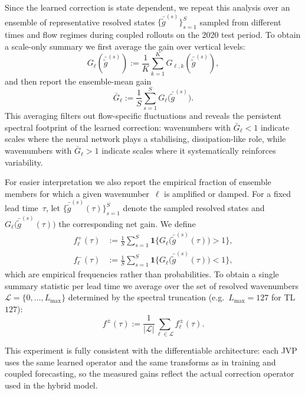 Since the learned correction is state dependent, we repeat this
analysis over an ensemble of representative resolved states
$\{\bar{\tilde{g}}^{(s)}\}_{s=1}^{S}$ sampled from different times
and flow regimes during coupled rollouts on the 2020 test period.
To obtain a scale-only summary we first average the gain over vertical
levels:
\begin{equation}
  G_{\ell}(\bar{\tilde{g}}^{(s)})
  :=
  \frac{1}{K}\sum_{k=1}^{K}
    G_{\ell,k}(\bar{\tilde{g}}^{(s)}),
\end{equation}
and then report the ensemble-mean gain
\begin{equation}
  \bar{G}_{\ell}
  :=
  \frac{1}{S}\sum_{s=1}^{S}
    G_{\ell}\!\bigl(\bar{\tilde{g}}^{(s)}\bigr).
\end{equation}
This averaging filters out flow-specific fluctuations and reveals the
persistent spectral footprint of the learned correction: wavenumbers
with $\bar{G}_{\ell} < 1$ indicate scales where the neural network
plays a stabilising, dissipation-like role, while wavenumbers with
$\bar{G}_{\ell} > 1$ indicate scales where it systematically reinforces
variability.

For easier interpretation we also report the empirical fraction of
ensemble members for which a given wavenumber~$\ell$ is amplified or
damped.  For a fixed lead time~$\tau$, let
$\{\bar{\tilde{g}}^{(s)}(\tau)\}_{s=1}^{S}$ denote the sampled
resolved states and $G_{\ell}\!\bigl(\bar{\tilde{g}}^{(s)}(\tau)\bigr)$
the corresponding net gain.  We define
\begin{align}
  f^{+}_{\ell}(\tau)
  &:=
  \frac{1}{S}\sum_{s=1}^{S}
    \mathbf{1}\!\bigl\{
      G_{\ell}\!\bigl(\bar{\tilde{g}}^{(s)}(\tau)\bigr) > 1
    \bigr\},
  \\
  f^{-}_{\ell}(\tau)
  &:=
  \frac{1}{S}\sum_{s=1}^{S}
    \mathbf{1}\!\bigl\{
      G_{\ell}\!\bigl(\bar{\tilde{g}}^{(s)}(\tau)\bigr) < 1
    \bigr\},
\end{align}
which are empirical frequencies rather than probabilities.  To obtain a
single summary statistic per lead time we average over the set of
resolved wavenumbers
$\mathcal{L} = \{0,\dots,L_{\max}\}$ determined by the spectral
truncation (e.g.\ $L_{\max}=127$ for TL$127$):
\begin{equation}
  f^{\pm}(\tau)
  :=
  \frac{1}{|\mathcal{L}|}\sum_{\ell \in \mathcal{L}}
    f^{\pm}_{\ell}(\tau).
\end{equation}

This experiment is fully consistent with the differentiable
architecture: each JVP uses the same learned operator and the same
transforms as in training and coupled forecasting, so the measured gains
reflect the actual correction operator used in the hybrid model.